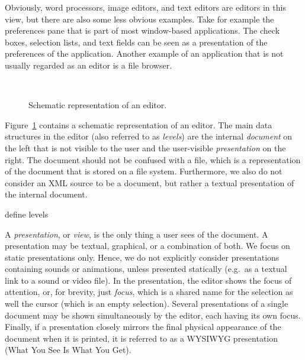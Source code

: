 Obviously, word processors, image editors, and text editors are editors in this view, but there are also some less obvious examples. Take for example the preferences pane that is part of most window-based applications. The check boxes, selection lists, and text fields can be seen as a presentation of the preferences of the application. Another example of an application that is not usually regarded as an editor is a file browser.


\begin{figure}
\begin{small}
\begin{center}
\begin{center}
~\hspace{1.7cm}
\end{center}\caption{Schematic representation of an editor.}\label{editor} 
\end{center}
\end{small}
\end{figure}

Figure~\ref{editor} contains a schematic representation of an editor. The main data structures in the editor (also referred to as {\em levels}) are the internal {\em document} on the left that is not visible to the user and the user-visible {\em presentation} on the right. The document should not be confused with a file, which is a representation of the document that is stored on a file system. Furthermore, we also do not consider an XML source to be a document, but rather a textual presentation of the internal document.

\bc define levels \ec

A {\em presentation}, or {\em view}, is the only thing a user sees of the document. A presentation may be textual, graphical, or a combination of both. We focus on static presentations only. Hence, we do not explicitly consider presentations containing sounds or animations, unless presented statically (e.g.\ as a textual link to a sound or video file). In the presentation, the editor shows the focus of attention, or, for brevity, just {\em focus}, which is a shared name for the selection as well the cursor (which is an empty selection).  Several presentations of a single document may be shown simultaneously by the editor, each having its own focus. Finally, if a presentation closely mirrors the final physical appearance of the document when it is printed, it is referred to as a WYSIWYG presentation (What You See Is What You Get).

